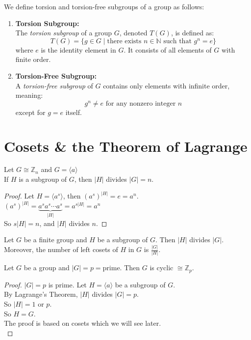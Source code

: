 \begin{definition}
    We define torsion and torsion-free subgroups of a group as follows:\\
    \begin{enumerate}
        \item \textbf{Torsion Subgroup:} \\
        The \textit{torsion subgroup} of a group \( G \), denoted \( T(G) \), is defined as:
        \[
        T(G) = \{ g \in G \mid \text{there exists } n \in \mathbb{N} \text{ such that } g^n = e \}
        \]
        where \( e \) is the identity element in \( G \). It consists of all elements of \( G \) with finite order.

        \item \textbf{Torsion-Free Subgroup:} \\
        A \textit{torsion-free subgroup} of \( G \) contains only elements with infinite order, meaning:
        \[
        g^n \neq e \text{ for any nonzero integer } n
        \]
        except for \( g = e \) itself.
    \end{enumerate}
\end{definition}

\section{Cosets \& the Theorem of Lagrange}

\begin{remark}
    Let $G \cong \mathbb{Z}_n$ and $G = \langle a \rangle$ \\
    If $H$ is a subgroup of $G$, then $|H|$ divides $|G|=n$.\\
\end{remark}
\begin{proof}
    Let $H = \langle a^s \rangle$, then $(a^s)^{|H|} = e = a^n$.\\
    $(a^s)^{|H|} = \underbrace{a^sa^s \cdots a^s}_{|H|} = a^{s|H|} = a^n$\\
    So $s|H| = n$, and $|H|$ divides $n$.
\end{proof}

\begin{theorem}
    Let $G$ be a finite group and $H$ be a subgroup of $G$. Then $|H|$ divides $|G|$.\\
    Moreover, the number of left cosets of $H$ in $G$ is $\frac{|G|}{|H|}$.
\end{theorem}

\begin{corollary}
    Let $G$ be a group and $|G| = p = $prime. Then $G$ is cyclic $\cong \mathbb{Z}_p$.
\end{corollary}
\begin{proof}
    $|G| = p$ is prime. Let $H = \langle a \rangle$ be a subgroup of $G$.\\ 
    By Lagrange's Theorem, $|H|$ divides $|G| = p$.\\ So $|H| = 1$ or $p$.\\ So $H = G$.\\

    The proof is based on cosets which we will see later.\\ 
\end{proof}

